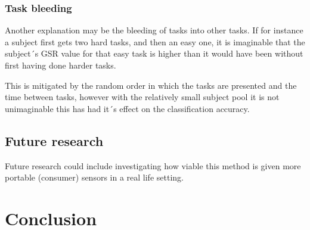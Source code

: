 \documentclass[12pt,fleqn,leqno,letterpaper]{article}
\begin{document}
\subsubsection{Task bleeding}
Another explanation may be the bleeding of tasks into other tasks. If for instance a subject first gets two hard tasks, and then an easy one, it is imaginable that the subject´s GSR value for that easy task is higher than it would have been without first having done harder tasks. 

This is mitigated by the random order in which the tasks are presented and the time between tasks, however with the relatively small subject pool it is not unimaginable this has had it´s effect on the classification accuracy.




\subsection{Future research}
Future research could include investigating how viable this method is given more portable (consumer) sensors in a real life setting. 

\section{Conclusion}





{}
%
\end{document}
